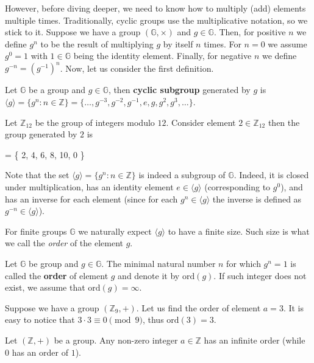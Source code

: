\documentclass[../lecture-notes-148x210.tex]{subfiles}
\begin{document}
However, before diving deeper, we need to know how to multiply (add) elements
multiple times. Traditionally, cyclic groups use the multiplicative notation, so
we stick to it. Suppose we have a group $(\mathbb{G},\times)$ and $g \in
\mathbb{G}$. Then, for positive $n$ we define $g^n$ to be the result of
multiplying $g$ by itself $n$ times. For $n=0$ we assume $g^0=1$ with $1 \in
\mathbb{G}$ being the identity element. Finally, for negative $n$ we define
$g^{-n} = (g^{-1})^n$. Now, let us consider the first definition.
\begin{definition}
    Let $\mathbb{G}$ be a group and $g \in \mathbb{G}$, then \textbf{cyclic subgroup} generated 
    by $g$ is $\langle g \rangle = \{g^n: n \in \mathbb{Z}\} = 
    \{\dots,g^{-3}, g^{-2}, g^{-1}, e, g, g^2, g^3, \dots\}$.
\end{definition}

\begin{example}
    Let $\mathbb{Z}_{12}$ be the group of integers modulo $12$. 
    Consider element $2 \in \mathbb{Z}_{12}$ then the group generated by $2$ is
    \begin{xequation}
         \rangle = \{ 2, 4, 6, 8, 10, 0 \}
    \end{xequation}
\end{example}

Note that the set $\langle g \rangle = \{g^n: n \in \mathbb{Z}\}$ is indeed a
subgroup of $\mathbb{G}$. Indeed, it is closed under multiplication, has an
identity element $e \in \langle g \rangle$ (corresponding to $g^0$), and has an
inverse for each element (since for each $g^n \in \langle g \rangle$ the inverse is defined 
as $g^{-n} \in \langle g \rangle$).

For finite groups $\mathbb{G}$ we naturally expect $\langle g \rangle$ to have a finite 
size. Such size is what we call the \textit{order} of the element $g$.

\begin{definition}
    Let $\mathbb{G}$ be group and $g \in \mathbb{G}$. The minimal natural number
    $n$ for which $g^n = 1$ is called the \textbf{order} of element $g$ and
    denote it by $\text{ord}(g)$. If such integer does not exist, we assume that
    $\text{ord}(g)=\infty$.
\end{definition}

\begin{example}
    Suppose we have a group $(\mathbb{Z}_9, +)$. Let us find the order of
    element $a = 3$. It is easy to notice that $3 \cdot 3 \equiv 0 \pmod{9}$,
    thus $\text{ord}(3) = 3$.
\end{example}
\begin{example}
    Let $(\mathbb{Z}, +)$ be a group. Any non-zero integer $a \in \mathbb{Z}$
    has an infinite order (while $0$ has an order of $1$).
\end{example}
\end{document}
